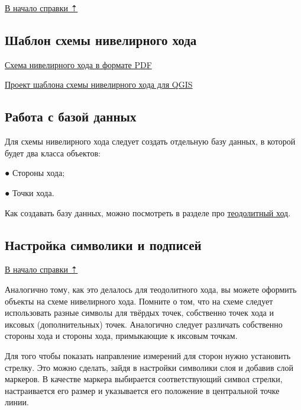 \documentclass[
  12pt,
]{book}
\begin{document}
\hyperref[practice]{В начало справки ⇡}

\subsection{Шаблон схемы нивелирного хода}\label{practice-level-template}

\href{https://disk.yandex.ru/i/vxkXew-pAmtdRg}{Схема нивелирного хода в формате PDF}

\href{https://disk.yandex.ru/d/frDDrler8BldDQ}{Проект шаблона схемы нивелирного хода для QGIS}

\subsection{Работа с базой данных}\label{practice-level-DB}

Для схемы нивелирного хода следует создать отдельную базу данных, в которой будет два класса объектов:

● Стороны хода;

● Точки хода.

Как создавать базу данных, можно посмотреть в разделе про \hyperref[practice-theod-DB]{теодолитный ход}.

\subsection{Настройка символики и подписей}\label{practice-level-symbology}

\hyperref[practice-level]{В начало справки ⇡}

Аналогично тому, как это делалось для теодолитного хода, вы можете оформить объекты на схеме нивелирного хода. Помните о том, что на схеме следует использовать разные символы для твёрдых точек, собственно точек хода и иксовых (дополнительных) точек. Аналогично следует различать собственно стороны хода и стороны хода, примыкающие к иксовым точкам.

Для того чтобы показать направление измерений для сторон нужно установить стрелку. Это можно сделать, зайдя в настройки символики слоя и добавив слой маркеров. В качестве маркера выбирается соответствующий символ стрелки, настраивается его размер и указывается его положение в центральной точке линии.
\end{document}
